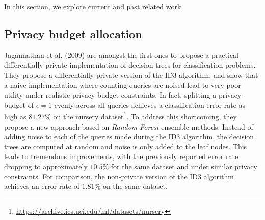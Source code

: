 In this section, we explore current and past related work.

\subsection{Privacy budget allocation}\label{sec:budget_allocation}

Jagannathan et al. (2009) \cite{jagannathan} are amongst the first ones to propose a practical differentially private implementation of decision trees for classification problems. They propose a differentially private version of the ID3 algorithm, and show that a naive implementation where counting queries are noised lead to very poor utility under realistic privacy budget constraints. In fact, splitting a privacy budget of $\epsilon=1$ evenly across all queries achieves a classification error rate as high as $81.27\%$ on the nursery dataset\footnote{\href{https://archive.ics.uci.edu/ml/datasets/nursery}{https://archive.ics.uci.edu/ml/datasets/nursery}}. To address this shortcoming, they propose a new approach based on \textit{Random Forest} ensemble methods. Instead of adding noise to each of the queries made during the ID3 algorithm, the decision trees are computed at random and noise is only added to the leaf nodes. This leads to tremendous improvements, with the previously reported error rate dropping to approximately $10.5\%$ for the same dataset and under similar privacy constraints. For comparison, the non-private version of the ID3 algorithm achieves an error rate of $1.81\%$ on the same dataset.

